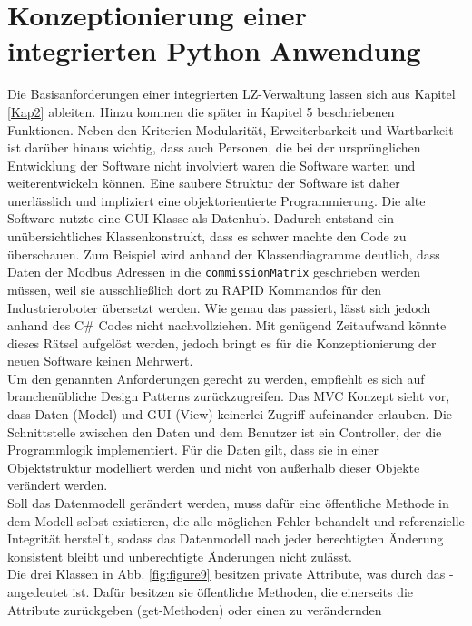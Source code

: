 
\chapter{Konzeptionierung einer integrierten Python Anwendung}\label{PythonApp}

Die Basisanforderungen einer integrierten LZ-Verwaltung lassen sich aus Kapitel \ref{Kap2} ableiten.
Hinzu kommen die später in Kapitel 5 beschriebenen Funktionen.
Neben den Kriterien Modularität, Erweiterbarkeit und Wartbarkeit ist darüber hinaus wichtig, dass auch Personen,
die bei der ursprünglichen Entwicklung der Software nicht involviert waren die Software warten und weiterentwickeln können.
Eine saubere Struktur der Software ist daher unerlässlich und impliziert eine objektorientierte Programmierung.
Die alte Software nutzte eine GUI-Klasse als Datenhub.
Dadurch entstand ein unübersichtliches Klassenkonstrukt, dass es schwer machte den Code zu überschauen.
Zum Beispiel wird anhand der Klassendiagramme deutlich, dass Daten der Modbus Adressen in die \verb|commissionMatrix|
geschrieben werden müssen, weil sie ausschließlich dort zu RAPID Kommandos für den Industrieroboter übersetzt werden.
Wie genau das passiert, lässt sich jedoch anhand des C\# Codes nicht nachvollziehen.
Mit genügend Zeitaufwand könnte dieses Rätsel aufgelöst werden, jedoch bringt es für die Konzeptionierung der neuen
Software keinen Mehrwert.\\
\vspace{1cm}
Um den genannten Anforderungen gerecht zu werden, empfiehlt es sich auf branchenübliche Design Patterns
zurückzugreifen.
Das MVC Konzept sieht vor, dass Daten (Model) und GUI (View) keinerlei Zugriff aufeinander erlauben.
Die Schnittstelle zwischen den Daten und dem Benutzer ist ein Controller, der die Programmlogik implementiert.
Für die Daten gilt, dass sie in einer Objektstruktur modelliert werden und nicht von außerhalb dieser Objekte verändert
werden.\\
\vspace{1cm}
Soll das Datenmodell gerändert werden, muss dafür eine öffentliche Methode in dem Modell selbst existieren,
die alle möglichen Fehler behandelt und referenzielle Integrität herstellt, sodass das Datenmodell nach jeder berechtigten
Änderung konsistent bleibt und unberechtigte Änderungen nicht zulässt.\\
Die drei Klassen in Abb. \ref{fig:figure9} besitzen private Attribute, was durch das \glqq - \grqq angedeutet ist.
Dafür besitzen sie öffentliche Methoden, die einerseits die Attribute zurückgeben (get-Methoden) oder einen zu verändernden
